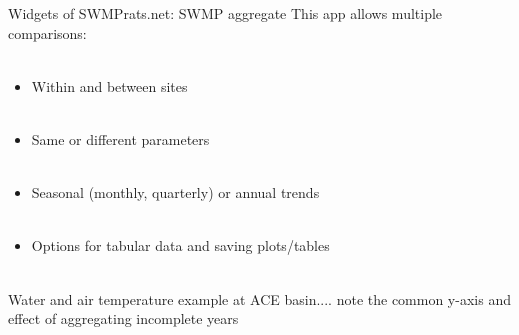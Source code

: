 \documentclass[xcolor=dvipsnames,serif]{beamer}\usepackage[]{graphicx}\usepackage[]{color}
\newcommand{\Bigtxt}[1]{\textbf{\textit{#1}}}
\begin{document}
\begin{frame}{Widgets of SWMPrats.net: SWMP aggregate}
This app allows multiple comparisons: \\~\\
\begin{itemize}
\item Within and between sites \\~\\
\item Same or different parameters \\~\\
\item Seasonal (monthly, quarterly) or annual trends \\~\\
\item Options for tabular data and saving plots/tables \\~\\
\end{itemize}
Water and air temperature example at ACE basin.... note the common y-axis and effect of aggregating incomplete years
\end{frame}

\end{document}
